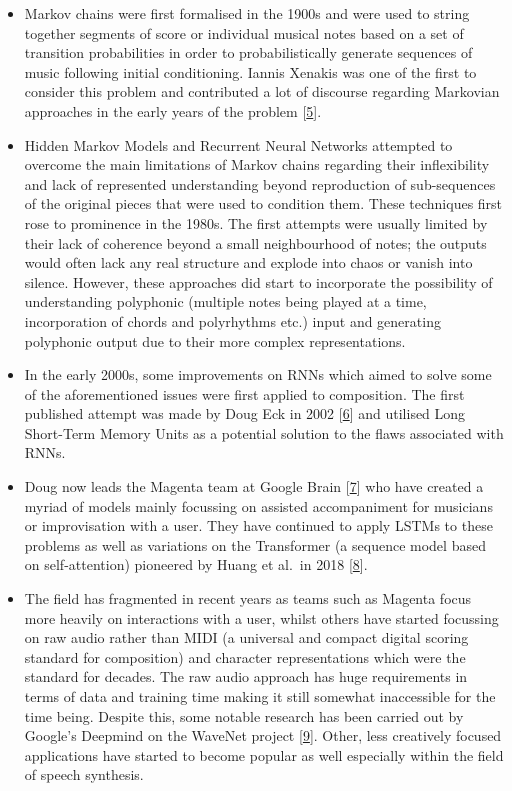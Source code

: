 \documentclass[12pt,]{article}
\providecommand{\tightlist}{%
  \setlength{\itemsep}{0pt}\setlength{\parskip}{0pt}}
\begin{document}
\begin{itemize}
\tightlist
\item
  Markov chains were first formalised in the 1900s and were used to
  string together segments of score or individual musical notes based on
  a set of transition probabilities in order to probabilistically
  generate sequences of music following initial conditioning. Iannis
  Xenakis was one of the first to consider this problem and contributed
  a lot of discourse regarding Markovian approaches in the early years
  of the problem {[}\protect\hyperlink{ref-luque2009stochastic}{5}{]}.
\item
  Hidden Markov Models and Recurrent Neural Networks attempted to
  overcome the main limitations of Markov chains regarding their
  inflexibility and lack of represented understanding beyond
  reproduction of sub-sequences of the original pieces that were used to
  condition them. These techniques first rose to prominence in the
  1980s. The first attempts were usually limited by their lack of
  coherence beyond a small neighbourhood of notes; the outputs would
  often lack any real structure and explode into chaos or vanish into
  silence. However, these approaches did start to incorporate the
  possibility of understanding polyphonic (multiple notes being played
  at a time, incorporation of chords and polyrhythms etc.) input and
  generating polyphonic output due to their more complex
  representations.
\item
  In the early 2000s, some improvements on RNNs which aimed to solve
  some of the aforementioned issues were first applied to composition.
  The first published attempt was made by Doug Eck in 2002
  {[}\protect\hyperlink{ref-eck2002finding}{6}{]} and utilised Long
  Short-Term Memory Units as a potential solution to the flaws
  associated with RNNs.
\item
  Doug now leads the Magenta team at Google Brain
  {[}\protect\hyperlink{ref-magenta}{7}{]} who have created a myriad of
  models mainly focussing on assisted accompaniment for musicians or
  improvisation with a user. They have continued to apply LSTMs to these
  problems as well as variations on the Transformer (a sequence model
  based on self-attention) pioneered by Huang et al.~in 2018
  {[}\protect\hyperlink{ref-huang2018improved}{8}{]}.
\item
  The field has fragmented in recent years as teams such as Magenta
  focus more heavily on interactions with a user, whilst others have
  started focussing on raw audio rather than MIDI (a universal and
  compact digital scoring standard for composition) and character
  representations which were the standard for decades. The raw audio
  approach has huge requirements in terms of data and training time
  making it still somewhat inaccessible for the time being. Despite
  this, some notable research has been carried out by Google's Deepmind
  on the WaveNet project
  {[}\protect\hyperlink{ref-oord2016wavenet}{9}{]}. Other, less
  creatively focused applications have started to become popular as well
  especially within the field of speech synthesis.
\end{itemize}
\end{document}
